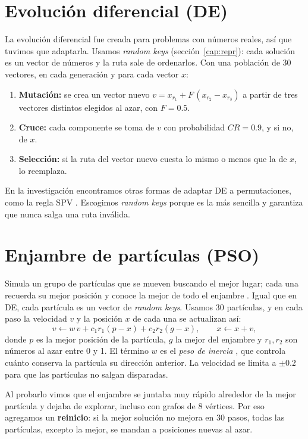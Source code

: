 \section{Evolución diferencial (DE)}
\label{sec:de}
La evolución diferencial \cite{de10} fue creada para problemas con números reales, así que tuvimos que
adaptarla. Usamos \emph{random keys} \cite{de13} (sección~\ref{cap:repr}): cada solución es un vector de
números y la ruta sale de ordenarlos. Con una población de 30 vectores, en cada generación y para
cada vector $x$:
\begin{enumerate}
  \item \textbf{Mutación:} se crea un vector nuevo $v = x_{r_1} + F\,(x_{r_2}-x_{r_3})$ a partir de
        tres vectores distintos elegidos al azar, con $F=0.5$.
  \item \textbf{Cruce:} cada componente se toma de $v$ con probabilidad $CR=0.9$, y si no, de $x$.
  \item \textbf{Selección:} si la ruta del vector nuevo cuesta lo mismo o menos que la de $x$, lo
        reemplaza.
\end{enumerate}
En la investigación encontramos otras formas de adaptar DE a permutaciones, como la regla SPV
\cite{de17}. Escogimos \emph{random keys} porque es la más sencilla y garantiza que nunca salga
una ruta inválida.

\section{Enjambre de partículas (PSO)}
\label{sec:pso}
Simula un grupo de partículas que se mueven buscando el mejor lugar; cada una recuerda su mejor
posición y conoce la mejor de todo el enjambre \cite{pso1995}. Igual que en DE, cada partícula es
un vector de \emph{random keys}. Usamos 30 partículas, y en cada paso la velocidad $v$ y la
posición $x$ de cada una se actualizan así:
\[
v \leftarrow w\,v + c_1 r_1 (p - x) + c_2 r_2 (g - x), \qquad x \leftarrow x + v,
\]
donde $p$ es la mejor posición de la partícula, $g$ la mejor del enjambre y $r_1,r_2$ son números
al azar entre 0 y 1. El término $w$ es el \emph{peso de inercia} \cite{pso1998}, que controla
cuánto conserva la partícula su dirección anterior. La velocidad se limita a $\pm0.2$ para que
las partículas no salgan disparadas.

Al probarlo vimos que el enjambre se juntaba muy rápido alrededor de la mejor partícula y dejaba
de explorar, incluso con grafos de 8 vértices. Por eso agregamos un \textbf{reinicio}: si la mejor
solución no mejora en 30 pasos, todas las partículas, excepto la mejor, se mandan a posiciones
nuevas al azar.
